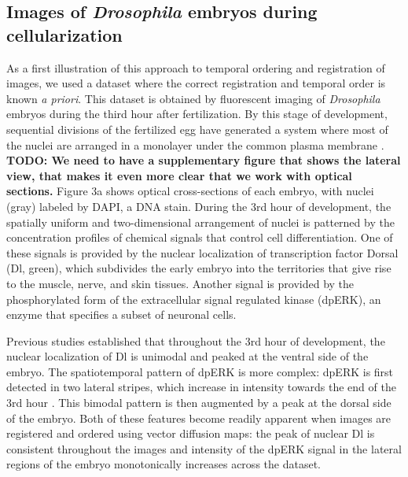 \documentclass{pnastwo}
\begin{document}
\begin{article}
\subsection{Images of {\it Drosophila} embryos during cellularization}



%
As a first illustration of this approach to temporal ordering and registration of images, we used a dataset where the correct registration and temporal order is known {\it a priori}. 
%
This dataset is obtained by fluorescent imaging of {\it Drosophila} embryos during the third hour after fertilization.
%
By this stage of development, sequential divisions of the fertilized egg have generated a system where most of the nuclei are arranged in a monolayer under the common plasma membrane \cite{foe1983studies}. {\bf TODO: We need to have a supplementary figure that shows the lateral view, that makes it even more clear that we work with optical sections.}
%
Figure 3a shows optical cross-sections of each embryo, with nuclei (gray) labeled by DAPI, a DNA stain. 
%
During the 3rd hour of development, the spatially uniform and two-dimensional arrangement of nuclei is patterned by the concentration profiles of chemical signals that control cell differentiation.
%
One of these signals is provided by the nuclear localization of transcription factor Dorsal (Dl, green), which subdivides the early embryo into the territories that give rise to the muscle, nerve, and skin tissues.
%
Another signal is provided by the phosphorylated form of the extracellular signal regulated kinase (dpERK), an enzyme that specifies a subset of neuronal cells. 
%

Previous studies \cite{rushlow2012temporal} established that throughout the 3rd hour of development, the nuclear localization of Dl is unimodal and peaked at the ventral side of the embryo. 
%
The spatiotemporal pattern of dpERK is more complex: dpERK is first detected in two lateral stripes, which increase in intensity towards the end of the 3rd hour \cite{lim2013kinetics}.  
%
This bimodal pattern is then augmented by a peak at the dorsal side of the embryo.
%
Both of these features become readily apparent when images are registered and ordered using vector diffusion maps: the peak of nuclear Dl is consistent throughout the images and intensity of the dpERK signal in the lateral regions of the embryo monotonically increases across the dataset.
%


\end{article}
\end{document}
